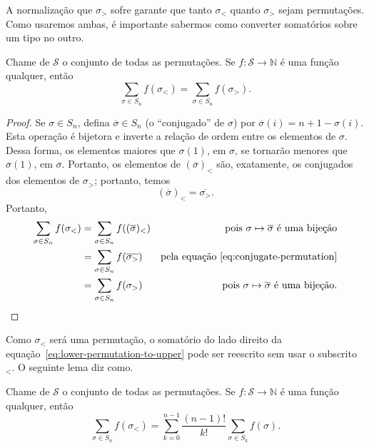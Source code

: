 A normalização que $\sigma_>$ sofre garante que
tanto $\sigma_<$ quanto $\sigma_>$ sejam permutações.
Como usaremos ambas,
é importante sabermos como converter somatórios sobre um tipo no outro.

\begin{lemma}
    Chame de $\mathcal S$ o conjunto de todas as permutações.
    Se $f: \mathcal S \to \mathbb N$ é uma função qualquer,
    então
    \begin{equation}
        \sum_{\sigma \in S_n} f(\sigma_<) = \sum_{\sigma \in S_n} f(\sigma_>).
        \label{eq:lower-permutation-to-upper}
    \end{equation}
\end{lemma}

\begin{proof}
    Se $\sigma \in S_n$,
    defina $\overline \sigma \in S_n$
    (o ``conjugado'' de $\sigma$)
    por $\overline \sigma(i) = n + 1 - \sigma(i)$.
    Esta operação é bijetora
    e inverte a relação de ordem entre os elementos de $\sigma$.
    Dessa forma, os elementos maiores que $\sigma(1)$, em $\sigma$,
    se tornarão menores que $\overline \sigma(1)$, em $\overline \sigma$.
    Portanto,
    os elementos de $(\overline \sigma)_<$ são,
    exatamente,
    os conjugados dos elementos de $\sigma_>$;
    portanto, temos
    \begin{equation}
        (\overline \sigma)_< = \overline{\sigma_>}.
        \label{eq:conjugate-permutation}
    \end{equation}
    Portanto,
    \begin{align*}
        \sum_{\sigma \in S_n} f(\sigma_<) &= \sum_{\sigma \in S_n} f((\overline \sigma)_<)
        &\text{pois $\sigma \mapsto \overline \sigma$ é uma bijeção} \\
        &= \sum_{\sigma \in S_n} f(\overline{\sigma_>})
        &\text{pela equação~\ref{eq:conjugate-permutation}} \\
        &= \sum_{\sigma \in S_n} f(\sigma_>)
        &\text{pois $\sigma \mapsto \overline \sigma$ é uma bijeção.}
    \end{align*}
\end{proof}

Como $\sigma_<$ será uma permutação,
o somatório do lado direito da equação~\ref{eq:lower-permutation-to-upper}
pode ser reescrito sem usar o subscrito ${}_<$.
O seguinte lema diz como.

\begin{lemma}
    Chame de $\mathcal S$ o conjunto de todas as permutações.
    Se $f: \mathcal S \to \mathbb N$ é uma função qualquer,
    então
    \begin{equation}
        \sum_{\sigma \in S_n} f(\sigma_<)
            = \sum_{k = 0}^{n-1} \frac{(n-1)!}{k!} \sum_{\sigma \in S_k} f(\sigma).
        \label{eq:sum-partitions}
    \end{equation}
\end{lemma}

